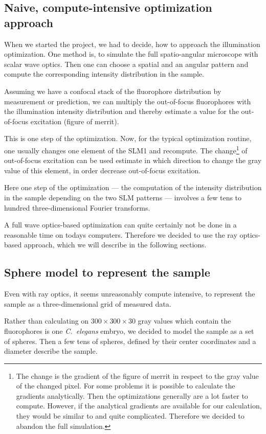 \subsection{Naive, compute-intensive optimization approach}
When we started the project, we had to decide, how to approach the
illumination optimization. One method is, to simulate the full
spatio-angular microscope with scalar wave optics. Then one can choose
a spatial and an angular pattern and compute the corresponding
intensity distribution in the sample.

Assuming we have a confocal stack of the fluorophore distribution by
measurement or prediction, we can multiply the out-of-focus
fluorophores with the illumination intensity distribution and thereby
estimate a value for the out-of-focus excitation (figure of merrit).

This is one step of the optimization. Now, for the typical
optimization routine, one usually changes one element of the SLM1 and
recompute. The change\footnote{The change is the gradient of the
  figure of merrit in respect to the gray value of the changed pixel.
  For some problems it is possible to calculate the gradients
  analytically. Then the optimizations generally are a lot faster to
  compute. However, if the analytical gradients are available for our
  calculation, they would be similar to \citet{Thurman2009} and quite
  complicated. Therefore we decided to abandon the full simulation.}
of out-of-focus excitation can be used estimate in which direction to
change the gray value of this element, in order decrease out-of-focus
excitation.

Here one step of the optimization --- the computation of the intensity
distribution in the sample depending on the two SLM patterns ---
involves a few tens to hundred three-dimensional Fourier transforms.

A full wave optics-based optimization can quite certainly not be done
in a reasonable time on todays computers. Therefore we decided to use
the ray optics-based approach, which we will describe in the following
sections.

\subsection{Sphere model to represent the sample}
\label{sec:shadow-map}
Even with ray optics, it seems unreasonably compute intensive, to
represent the sample as a three-dimensional grid of measured data.

Rather than calculating on $300\times 300\times 30$ gray values which
contain the fluorophores is one \emph{C.~elegans} embryo, we decided
to model the sample as a set of spheres.  Then a few tens of spheres,
defined by their center coordinates and a diameter describe the
sample.

